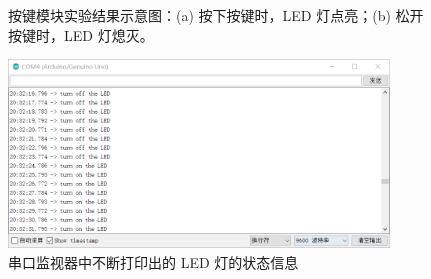\documentclass[UTF8, oneside]{ctexbook}
\begin{document}
\begin{figure}[h]
    \centering


    \centering
    \caption{按键模块实验结果示意图：(a) 按下按键时，LED 灯点亮；(b) 松开
    按键时，LED 灯熄灭。}
    \label{b4_1}
    
\end{figure}

\begin{figure}[h]
    \centering
    \includegraphics[width=0.9\textwidth]{./result/basic/4/result3.png}
    \caption{串口监视器中不断打印出的 LED 灯的状态信息}
    \label{b4_2}
\end{figure}
\end{document}
